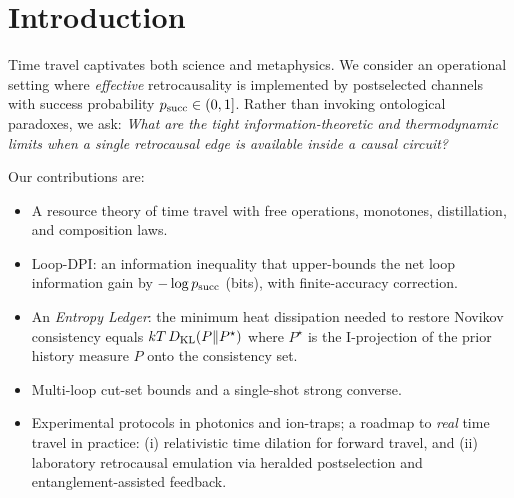 
\section{Introduction}
Time travel captivates both science and metaphysics. We consider an operational setting where \emph{effective} retrocausality is implemented by postselected channels with success probability $p_{\mathrm{succ}}\in(0,1]$. Rather than invoking ontological paradoxes, we ask: \emph{What are the tight information-theoretic and thermodynamic limits when a single retrocausal edge is available inside a causal circuit?}

Our contributions are:
\begin{itemize}
    \item A resource theory of time travel with free operations, monotones, distillation, and composition laws.
    \item Loop-DPI: an information inequality that upper-bounds the net loop information gain by $-\log p_{\mathrm{succ}}$ (bits), with finite-accuracy correction.
    \item An \emph{Entropy Ledger}: the minimum heat dissipation needed to restore Novikov consistency equals $kT\,D_{\mathrm{KL}}(P\Vert P^\star)$ where $P^\star$ is the I-projection of the prior history measure $P$ onto the consistency set.
    \item Multi-loop cut-set bounds and a single-shot strong converse.
    \item Experimental protocols in photonics and ion-traps; a roadmap to \emph{real} time travel in practice: (i) relativistic time dilation for forward travel, and (ii) laboratory retrocausal emulation via heralded postselection and entanglement-assisted feedback.
\end{itemize}
